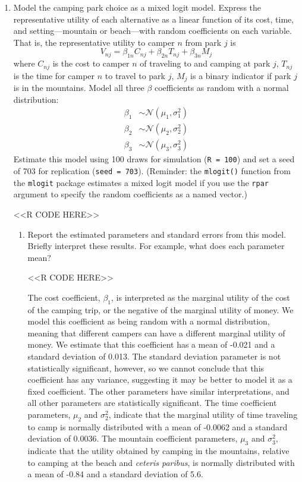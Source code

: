\documentclass[11pt,letterpaper]{article}
\begin{document}
\begin{enumerate}[label=\alph*., leftmargin=*]

	\item Model the camping park choice as a mixed logit model. Express the representative utility of each alternative as a linear function of its cost, time, and setting---mountain or beach---with random coefficients on each variable. That is, the representative utility to camper $n$ from park $j$ is
	$$V_{nj} = \beta_{1n} C_{nj} + \beta_{2n} T_{nj} + \beta_{3n} M_j$$
	where $C_{nj}$ is the cost to camper $n$ of traveling to and camping at park $j$, $T_{nj}$ is the time for camper $n$ to travel to park $j$, $M_j$ is a binary indicator if park $j$ is in the mountains. Model all three $\beta$ coefficients as random with a normal distribution:
	\begin{align*}
		\beta_1 & \sim \mathcal{N}(\mu_1, \sigma_1^2) \\
		\beta_2 & \sim \mathcal{N}(\mu_2, \sigma_2^2) \\
		\beta_3 & \sim \mathcal{N}(\mu_3, \sigma_3^2)
	\end{align*}
	Estimate this model using 100 draws for simulation (\texttt{R = 100}) and set a seed of 703 for replication (\texttt{seed = 703}). (Reminder: the \texttt{mlogit()} function from the \texttt{mlogit} package estimates a mixed logit model if you use the \texttt{rpar} argument to specify the random coefficients as a named vector.)

	<<R CODE HERE>>

	\begin{enumerate}[label=\roman*.]
		\item Report the estimated parameters and standard errors from this model. Briefly interpret these results. For example, what does each parameter mean?

		<<R CODE HERE>>

		The cost coefficient, $\beta_1$, is interpreted as the marginal utility of the cost of the camping trip, or the negative of the marginal utility of money. We model this coefficient as being random with a normal distribution, meaning that different campers can have a different marginal utility of money. We estimate that this coefficient has a mean of -0.021 and a standard deviation of 0.013. The standard deviation parameter is not statistically significant, however, so we cannot conclude that this coefficient has any variance, suggesting it may be better to model it as a fixed coefficient. The other parameters have similar interpretations, and all other parameters are statistically significant. The time coefficient parameters, $\mu_2$ and $\sigma_2^2$, indicate that the marginal utility of time traveling to camp is normally distributed with a mean of -0.0062 and a standard deviation of 0.0036. The mountain coefficient parameters, $\mu_3$ and $\sigma_3^2$, indicate that the utility obtained by camping in the mountains, relative to camping at the beach and \emph{ceteris paribus}, is normally distributed with a mean of -0.84 and a standard deviation of 5.6.
	\end{enumerate}


\end{enumerate}
\end{document}
